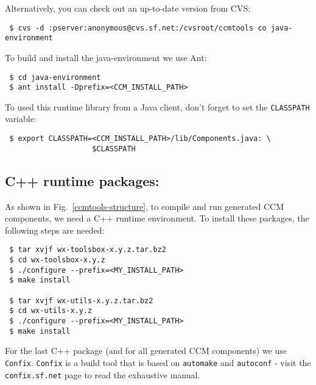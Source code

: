 Alternatively, you can check out an up-to-date version from CVS:
\begin{small}
\begin{verbatim}
 $ cvs -d :pserver:anonymous@cvs.sf.net:/cvsroot/ccmtools co java-environment
\end{verbatim}
\end{small}

To build and install the java-environment we use Ant:
\begin{small}
\begin{verbatim}
 $ cd java-environment
 $ ant install -Dprefix=<CCM_INSTALL_PATH>
\end{verbatim}
\end{small}

\noindent
To used this runtime library from a Java client, 
don't forget to set the {\tt CLASSPATH} variable:
\begin{small}
\begin{verbatim}
 $ export CLASSPATH=<CCM_INSTALL_PATH>/lib/Components.java: \
                    $CLASSPATH
\end{verbatim}
\end{small}



\subsection{C++ runtime packages:}
As shown in Fig.~\ref{ccmtools-structure}, to compile and run generated CCM
components, we need a C++ runtime environment.
To install these packages, the following steps are needed: 

\begin{small}
\begin{verbatim}
 $ tar xvjf wx-toolsbox-x.y.z.tar.bz2
 $ cd wx-toolsbox-x.y.z
 $ ./configure --prefix=<MY_INSTALL_PATH>
 $ make install

 $ tar xvjf wx-utils-x.y.z.tar.bz2
 $ cd wx-utils-x.y.z
 $ ./configure --prefix=<MY_INSTALL_PATH>
 $ make install     
\end{verbatim}
\end{small}

\noindent
For the last C++ package (and for all generated CCM components) we
use {\tt Confix}. 
{\tt Confix} is a build tool that is based on {\tt automake} and 
{\tt autoconf} - visit the {\tt confix.sf.net} page to read the
exhaustive manual. 

